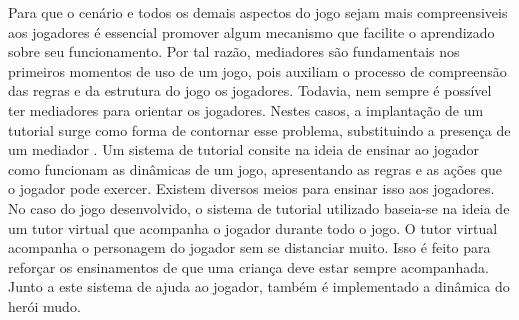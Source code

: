 
Para que o cenário e todos os demais aspectos do jogo sejam mais compreensiveis aos jogadores é essencial promover algum mecanismo que facilite o aprendizado sobre seu funcionamento. Por tal razão, mediadores são fundamentais nos primeiros momentos de uso de um jogo, pois auxiliam o processo de compreensão das regras e da estrutura do jogo os jogadores. Todavia, nem sempre é possível ter mediadores para orientar os jogadores. Nestes casos, a implantação de um tutorial surge como forma de contornar esse problema, substituindo a presença de um mediador \cite{buchinger2014sherlock}. Um sistema de tutorial consite na ideia de  ensinar ao jogador como funcionam as dinâmicas de um jogo, apresentando as regras e as ações que o jogador pode exercer. Existem diversos meios para ensinar isso aos jogadores. No caso do jogo desenvolvido, o sistema de tutorial utilizado baseia-se na ideia de um tutor virtual que acompanha o jogador durante todo o jogo. O tutor virtual acompanha o personagem do jogador sem se distanciar muito. Isso é feito para reforçar os ensinamentos de que uma criança deve estar sempre acompanhada. %
Junto a este sistema de ajuda ao jogador, também é implementado a dinâmica do herói mudo. %





